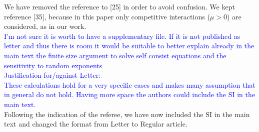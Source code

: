 \documentclass{article}
\newcommand{\blue}{\textcolor{blue}}
\begin{document}
	We have removed the reference to [25] in order to avoid confusion. 
	We kept reference [35], because in this paper only competitive interactions ($\mu > 0$) are considered, as in our work.
\\

    \blue{I'm not sure it is worth to have a supplementary file. If it is not  
	published as letter and thus there is room it would be suitable to  
	better explain already in the main text the finite size argument to  
	solve self consist equations and the sensitivity to random exponents} 
\\

	\blue{Justification for/against Letter:}  
\\

	\blue{These calculations hold for a very specific cases and makes many  
	assumption that in general do not hold. Having more space the authors  
	could include the SI in the main text.}
\\

	Following the indication of the referee, we have now included the SI in the main text and changed the format from Letter to Regular article.
\end{document}
